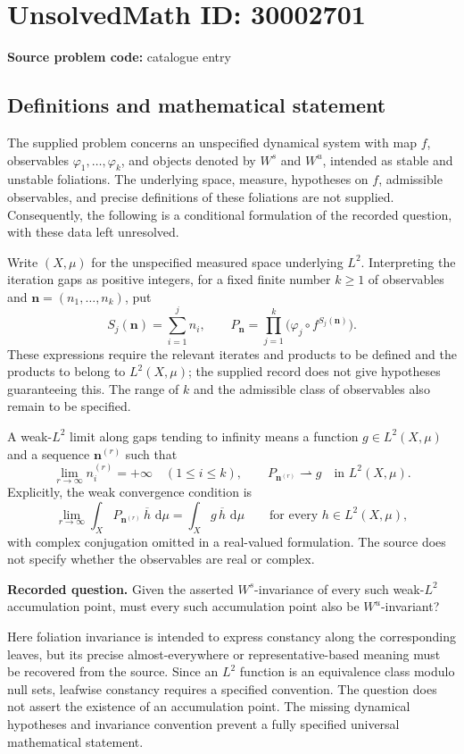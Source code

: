 \documentclass[11pt]{article}
\newcommand{\dd}{\,\mathrm{d}}
\begin{document}
\section*{UnsolvedMath ID: 30002701}
\textbf{Source problem code:} catalogue entry
\subsection{Definitions and mathematical statement}
The supplied problem concerns an unspecified dynamical system with map \(f\), observables \(\varphi_1,\ldots,\varphi_k\), and objects denoted by \(W^s\) and \(W^u\), intended as stable and unstable foliations. The underlying space, measure, hypotheses on \(f\), admissible observables, and precise definitions of these foliations are not supplied. Consequently, the following is a conditional formulation of the recorded question, with these data left unresolved.

Write \((X,\mu)\) for the unspecified measured space underlying \(L^2\). Interpreting the iteration gaps as positive integers, for a fixed finite number \(k\geq 1\) of observables and \(\mathbf n=(n_1,\ldots,n_k)\), put
\[
S_j(\mathbf n)=\sum_{i=1}^{j}n_i,
\qquad
P_{\mathbf n}=\prod_{j=1}^{k}\bigl(\varphi_j\circ f^{S_j(\mathbf n)}\bigr).
\]
These expressions require the relevant iterates and products to be defined and the products to belong to \(L^2(X,\mu)\); the supplied record does not give hypotheses guaranteeing this. The range of \(k\) and the admissible class of observables also remain to be specified.

A weak-\(L^2\) limit along gaps tending to infinity means a function \(g\in L^2(X,\mu)\) and a sequence \(\mathbf n^{(r)}\) such that
\[
\lim_{r\to\infty}n_i^{(r)}=+\infty
\quad(1\leq i\leq k),
\qquad
P_{\mathbf n^{(r)}}\rightharpoonup g
\quad\text{in }L^2(X,\mu).
\]
Explicitly, the weak convergence condition is
\[
\lim_{r\to\infty}\int_X P_{\mathbf n^{(r)}}\,\overline h\,\dd\mu
=
\int_X g\,\overline h\,\dd\mu
\qquad\text{for every }h\in L^2(X,\mu),
\]
with complex conjugation omitted in a real-valued formulation. The source does not specify whether the observables are real or complex.

\textbf{Recorded question.} Given the asserted \(W^s\)-invariance of every such weak-\(L^2\) accumulation point, must every such accumulation point also be \(W^u\)-invariant?

Here foliation invariance is intended to express constancy along the corresponding leaves, but its precise almost-everywhere or representative-based meaning must be recovered from the source. Since an \(L^2\) function is an equivalence class modulo null sets, leafwise constancy requires a specified convention. The question does not assert the existence of an accumulation point. The missing dynamical hypotheses and invariance convention prevent a fully specified universal mathematical statement.
\end{document}
